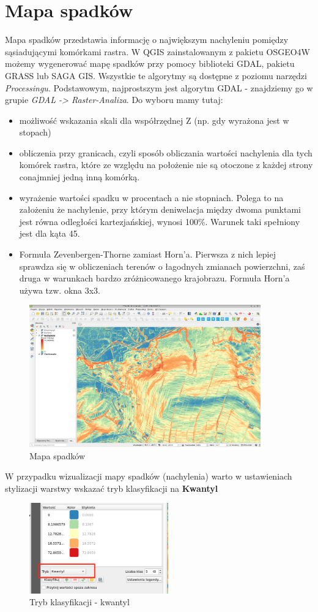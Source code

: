 \documentclass[a4paper,11pt, onecolumn, openany]{memoir}
\begin{document}
		\section{Mapa spadków}
		Mapa spadków przedstawia informację o największym nachyleniu pomiędzy sąsiadującymi komórkami rastra.
		W QGIS zainstalowanym z pakietu OSGEO4W możemy wygenerować mapę spadków przy pomocy biblioteki GDAL, pakietu GRASS lub SAGA GIS. Wszystkie te algorytmy są dostępne z poziomu narzędzi \emph{Processingu}.
		Podstawowym, najprostszym jest algorytm GDAL - znajdziemy go w grupie \emph{GDAL -> Raster-Analiza}.
		Do wyboru mamy tutaj:
		\begin{itemize}
			\item możliwość wskazania skali dla współrzędnej Z (np. gdy wyrażona jest w stopach)
			\item obliczenia przy granicach, czyli sposób obliczania wartości nachylenia dla tych komórek rastra, które ze względu na położenie nie są otoczone z każdej strony conajmniej jedną inną komórką.
			\item wyrażenie wartości spadku w procentach a nie stopniach. Polega to na założeniu że nachylenie, przy którym deniwelacja między dwoma punktami jest równa odległości kartezjańskiej, wynosi 100\%. Warunek taki spełniony jest dla kąta 45\degree.
			\item Formuła Zevenbergen-Thorne zamiast Horn'a. Pierwsza z nich lepiej sprawdza się w obliczeniach terenów o łagodnych zmianach powierzchni, zaś druga w warunkach bardzo zróżnicowanego krajobrazu. Formuła Horn'a używa tzw. okna 3x3.
		\end{itemize}
			\begin{figure}[!ht]
	\centering
	\includegraphics[width=10cm]{nmt-nachylenie}
	\caption{Mapa spadków}
\end{figure}
W przypadku wizualizacji mapy spadków (nachylenia) warto w ustawieniach stylizacji warstwy wskazać tryb klasyfikacji na \textbf{Kwantyl}
			\begin{figure}[!ht]
	\centering
	\includegraphics[width=6cm]{nmt-nachylenie-kwantyl}
	\caption{Tryb klasyfikacji - kwantyl}
\end{figure}
\end{document}
